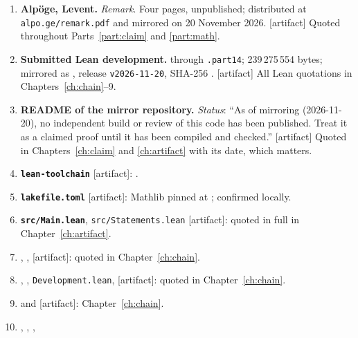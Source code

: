 \begin{enumerate}[leftmargin=1.4em,itemsep=4pt]
\item \textbf{Alpöge, Levent.} \emph{Remark}. Four pages, unpublished;
distributed at \texttt{alpo.ge/remark.pdf} and mirrored on 20 November 2026.
[artifact] Quoted throughout Parts~\ref{part:claim} and \ref{part:math}.
\item \textbf{Submitted Lean development.} 
through \texttt{.part14}; 239\,275\,554 bytes; mirrored as
, release \texttt{v2026-11-20},
SHA-256 .
[artifact] All Lean quotations in Chapters~\ref{ch:chain}--9.
\item \textbf{README of the mirror repository.} \emph{Status}: ``As of mirroring
(2026-11-20), no independent build or review of this code has been published.
Treat it as a claimed proof until it has been compiled and checked.'' [artifact]
Quoted in Chapters~\ref{ch:claim} and \ref{ch:artifact} with its date, which matters.
\item \textbf{\texttt{lean-toolchain}} [artifact]: .
\item \textbf{\texttt{lakefile.toml}} [artifact]: Mathlib pinned at
; confirmed locally.
\item \textbf{\texttt{src/Main.lean}}, \texttt{src/Statements.lean} [artifact]:
quoted in full in Chapter~\ref{ch:artifact}.
\item \textbf{},
,
 [artifact]:
quoted in Chapter~\ref{ch:chain}.
\item \textbf{},
,
\texttt{Development.lean},
 [artifact]:
quoted in Chapter~\ref{ch:chain}.
\item \textbf{}
and 
[artifact]: Chapter~\ref{ch:chain}.
\item \textbf{},
, ,

\end{enumerate}
